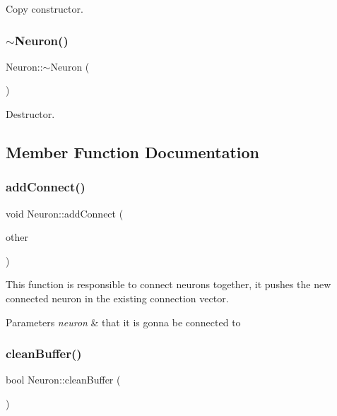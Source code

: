 Copy constructor. 

\mbox{\label{class_neuron_a94a250ce7e167760e593979b899745b1}} 
\subsubsection{$\sim$\+Neuron()}
{\footnotesize\ttfamily Neuron\+::$\sim$\+Neuron (\begin{DoxyParamCaption}{ }\end{DoxyParamCaption})\hspace{0.3cm}{\ttfamily [inline]}}



Destructor. 



\subsection{Member Function Documentation}
\mbox{\label{class_neuron_a337162e9c43f40516784b649f07ee0f9}} 
\subsubsection{add\+Connect()}
{\footnotesize\ttfamily void Neuron\+::add\+Connect (\begin{DoxyParamCaption}\item[{\textbf{ Neuron} $\ast$}]{other }\end{DoxyParamCaption})}

This function is responsible to connect neurons together, it pushes the new connected neuron in the existing connection vector. 
\begin{DoxyParams}{Parameters}
{\em neuron} & that it is gonna be connected to \\
\hline
\end{DoxyParams}
\mbox{\label{class_neuron_a931fddbafb3c4a5220dfe2d40e0fc249}} 
\subsubsection{clean\+Buffer()}
{\footnotesize\ttfamily bool Neuron\+::clean\+Buffer (\begin{DoxyParamCaption}{ }\end{DoxyParamCaption})}

